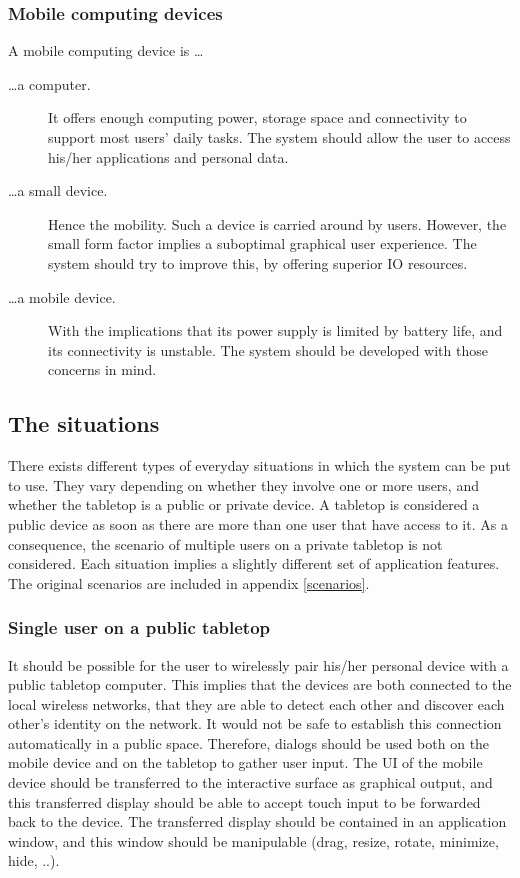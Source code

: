 \subsubsection{Mobile computing devices}

A mobile computing device is \ldots

\begin{description}

\item[\ldots a computer.] It offers enough computing power, storage space and connectivity to support most users' daily tasks. The system should allow the user to access his/her applications and personal data.

\item[\ldots a small device.] Hence the mobility. Such a device is carried around by users. However, the small form factor implies a suboptimal graphical user experience.
The system should try to improve this, by offering superior IO resources.

\item[\ldots a mobile device.] With the implications that its power supply is limited by battery life, and its connectivity is unstable. The system should be developed with those concerns in mind.

\end{description}

\subsection{The situations}

There exists different types of everyday situations in which the system can be put to use.
They vary depending on whether they involve one or more users, and whether the tabletop is a public or private device.
A tabletop is considered a public device as soon as there are more than one user that have access to it.
As a consequence, the scenario of multiple users on a private tabletop is not considered.
Each situation implies a slightly different set of application features.
The original scenarios are included in appendix \ref{scenarios}.

\subsubsection{Single user on a public tabletop}

It should be possible for the user to wirelessly pair his/her personal device with a public tabletop computer.
This implies that the devices are both connected to the local wireless networks, that they are able to detect each other and discover each other's identity on the network.
It would not be safe to establish this connection automatically in a public space.
Therefore, dialogs should be used both on the mobile device and on the tabletop to gather user input.
The UI of the mobile device should be transferred to the interactive surface as graphical output, and this transferred display should be able to accept touch input to be forwarded back to the device.
The transferred display should be contained in an application window, and this window should be manipulable (drag, resize, rotate, minimize, hide, ..).

